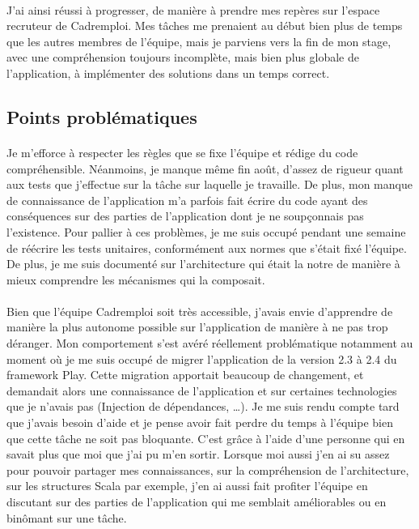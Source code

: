 \paragraph{}
J'ai ainsi réussi à progresser, de manière à prendre mes repères sur l'espace recruteur de Cadremploi.
Mes tâches me prenaient au début bien plus de temps que les autres membres de l'équipe, mais je parviens vers la fin de mon stage, avec une compréhension toujours incomplète, mais bien plus globale de l'application, à implémenter des solutions dans un temps correct.
\subsection{Points problématiques}
\label{sub:Points problématiques}
\paragraph{}
Je m'efforce à respecter les règles que se fixe l'équipe et rédige du code compréhensible.
Néanmoins, je manque même fin août, d'assez de rigueur quant aux tests que j'effectue sur la tâche sur laquelle je travaille.
De plus, mon manque de connaissance de l'application m'a parfois fait écrire du code ayant des conséquences sur des parties de l'application dont je ne soupçonnais pas l'existence.
Pour pallier à ces problèmes, je me suis occupé pendant une semaine de réécrire les tests unitaires, conformément aux normes que s'était fixé l'équipe.
De plus, je me suis documenté sur l'architecture qui était la notre de manière à mieux comprendre les mécanismes qui la composait.
\paragraph{}
Bien que l'équipe Cadremploi soit très accessible, j'avais envie d'apprendre de manière la plus autonome possible sur l'application de manière à ne pas trop déranger.
Mon comportement s'est avéré réellement problématique notamment au moment où je me suis occupé de migrer l'application de la version 2.3 à 2.4 du framework Play.
Cette migration apportait beaucoup de changement, et demandait alors une connaissance de l'application et sur certaines technologies que je n'avais pas (Injection de dépendances, \ldots).
Je me suis rendu compte tard que j'avais besoin d'aide et je pense avoir fait perdre du temps à l'équipe bien que cette tâche ne soit pas bloquante.
C'est grâce à l'aide d'une personne qui en savait plus que moi que j'ai pu m'en sortir.
Lorsque moi aussi j'en ai su assez pour pouvoir partager mes connaissances, sur la compréhension de l'architecture, sur les structures Scala par exemple, j'en ai aussi fait profiter l'équipe en discutant sur des parties de l'application qui me semblait améliorables ou en binômant sur une tâche.
